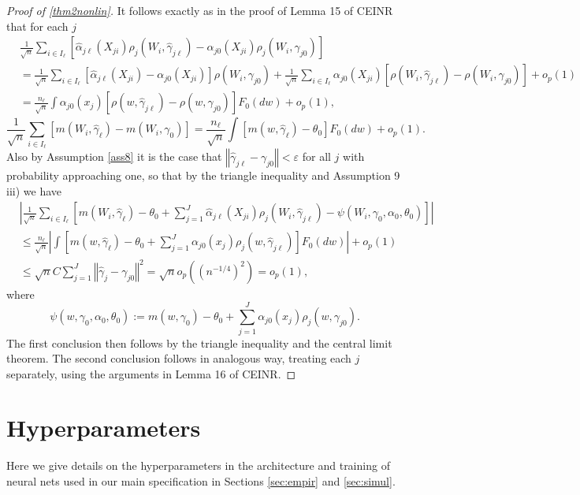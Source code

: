 \documentclass[aos]{imsart}
\numberwithin{equation}{section}
\theoremstyle{plain}
\theoremstyle{remark}
\begin{document}
\begin{appendix}
\begin{proof}[Proof of \ref{thm2nonlin}]
It follows exactly as in the proof of Lemma 15 of
CEINR that for each $j$
\begin{align*}
&  \frac{1}{\sqrt{n}}\sum_{i\in I_{\ell}}[\hat{\alpha}_{j\ell}(X_{ji})\rho
_{j}(W_{i},\hat{\gamma}_{j\ell})-\alpha_{j0}(X_{ji})\rho_{j}(W_{i},\gamma
_{j0})]\\
&  =\frac{1}{\sqrt{n}}\sum_{i\in I_{\ell}}[\hat{\alpha}_{j\ell}(X_{ji}%
)-\alpha_{j0}(X_{ji})]\rho(W_{i},\gamma_{j0})+\frac{1}{\sqrt{n}}\sum_{i\in
I_{\ell}}\alpha_{j0}(X_{ji})[\rho(W_{i},\hat{\gamma}_{j\ell})-\rho
(W_{i},\gamma_{j0})]+o_{p}(1)\\
&  =\frac{n_{\ell}}{\sqrt{n}}\int\alpha_{j0}(x_{j})[\rho(w,\hat{\gamma}%
_{j\ell})-\rho(w,\gamma_{j0})]F_{0}(dw)+o_{p}(1),
\end{align*}%
\[
\frac{1}{\sqrt{n}}\sum_{i\in I_{\ell}}[m(W_{i},\hat{\gamma}_{\ell}%
)-m(W_{i},\gamma_{0})]=\frac{n_{\ell}}{\sqrt{n}}\int[m(w,\hat{\gamma}_{\ell
})-\theta_{0}]F_{0}(dw)+o_{p}(1).
\]
Also by Assumption \ref{ass8} it is the case that $\left\Vert \hat{\gamma}_{j\ell
}-\gamma_{j0}\right\Vert <\varepsilon$ for all $j$ with probability
approaching one, so that by the triangle inequality and Assumption 9 iii) we
have%
\begin{align*}
&  \left\vert \frac{1}{\sqrt{n}}\sum_{i\in I_{\ell}}[m(W_{i},\hat{\gamma
}_{\ell})-\theta_{0}+\sum_{j=1}^{J}\hat{\alpha}_{j\ell}(X_{ji})\rho_{j}%
(W_{i},\hat{\gamma}_{j\ell})-\psi(W_{i},\gamma_{0},\alpha_{0},\theta
_{0})]\right\vert \\
&  \leq\frac{n_{\ell}}{\sqrt{n}}\left\vert \int[m(w,\hat{\gamma}_{\ell
})-\theta_{0}+\sum_{j=1}^{J}\alpha_{j0}(x_{j})\rho_{j}(w,\hat{\gamma}_{j\ell
})]F_{0}(dw)\right\vert +o_{p}(1)\\
&  \leq\sqrt{n}C\sum_{j=1}^{J}\left\Vert \hat{\gamma}_{j}-\gamma
_{j0}\right\Vert ^{2}=\sqrt{n}o_{p}((n^{-1/4})^{2})=o_{p}(1),
\end{align*}
where
\[
\psi(w,\gamma_{0},\alpha_{0},\theta_{0}):=m(w,\gamma_{0})-\theta_{0}%
+\sum_{j=1}^{J}\alpha_{j0}(x_{j})\rho_{j}(w,\gamma_{j0}).
\]
The first conclusion then follows by the triangle inequality and the central
limit theorem. The second conclusion follows in analogous way, treating each
$j$ separately, using the arguments in Lemma 16 of CEINR.
\end{proof}

\section{Hyperparameters \label{sec:hyperpar}}
Here we give details on the hyperparameters in the architecture and training of neural nets used in our main specification in Sections \ref{sec:empir} and \ref{sec:simul}.


\end{appendix}
\end{document}
